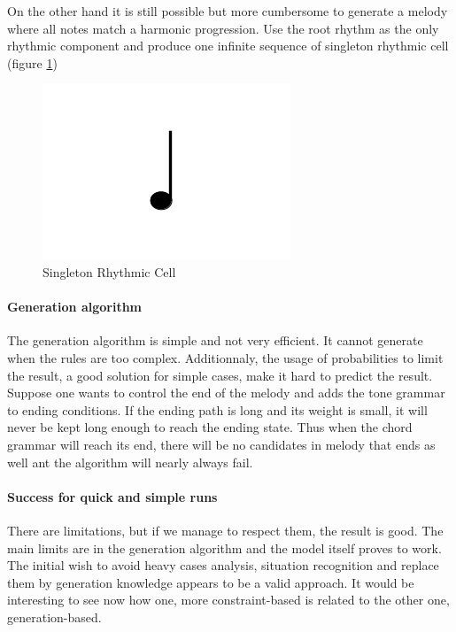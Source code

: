 \documentclass[twocolumn, 11pt]{article}
\begin{document}
On the other hand it is still possible but more cumbersome to generate a melody where all notes match a harmonic progression. Use the root rhythm as the only rhythmic component and produce one infinite sequence of singleton rhythmic cell (figure \ref{fig:singleTonRC})

\begin{figure}[h]
  \centering
  \includegraphics[scale=0.4]{n}
  \caption{Singleton Rhythmic Cell}
  \label{fig:singleTonRC}
\end{figure}



\paragraph{Generation algorithm}

The generation algorithm is simple and not very efficient. It cannot generate when the rules are too complex. Additionnaly, the usage of probabilities to limit the result, a good solution for simple cases, make it hard to predict the result. Suppose one wants to control the end of the melody and adds the tone grammar to ending conditions. If the ending path is long and its weight is small, it will never be kept long enough to reach the ending state. Thus when the chord grammar will reach its end, there will be no candidates in melody that ends as well ant the algorithm will nearly always fail.


\paragraph{Success for quick and simple runs}

There are limitations, but if we manage to respect them, the result is good. The main limits are in the generation algorithm and the model itself proves to work. The initial wish to avoid heavy cases analysis, situation recognition and replace them by generation knowledge appears to be a valid approach. It would be interesting to see now how one, more constraint-based is related to the other one, generation-based.
\end{document}
